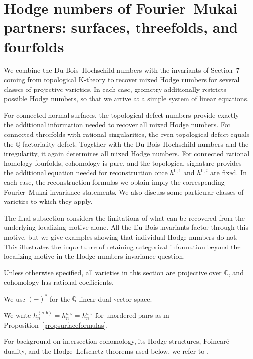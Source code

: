 \documentclass{amsart}
\theoremstyle{plain}
\theoremstyle{definition}
\newcommand{\bbC}{\mathbb{C}}
\newcommand{\bbQ}{\mathbb{Q}}
\begin{document}
\medskip

\section{Hodge numbers of Fourier--Mukai partners: surfaces, threefolds, and fourfolds}
\label{sechodgereconstruction}

We combine the Du Bois--Hochschild numbers with the invariants of Section~7 coming from topological K-theory to recover mixed Hodge numbers for several classes of projective varieties. In each case, geometry additionally restricts possible Hodge numbers, so that we arrive at a simple system of linear equations.

For connected normal surfaces, the topological defect numbers provide exactly the additional information needed to recover all mixed Hodge numbers. For connected threefolds with rational singularities, the even topological defect equals the
$\bbQ$-factoriality defect. Together with the Du Bois--Hochschild numbers and the irregularity, it again determines all mixed Hodge numbers.
For connected rational homology fourfolds, cohomology is pure, and the topological signature provides the additional equation needed for reconstruction once $h^{0,1}$ and $h^{0,2}$ are fixed. In each case, the reconstruction formulas we obtain imply the corresponding Fourier--Mukai invariance statements. We also discuss some particular classes of varieties to which they apply.

The final subsection considers the limitations of what can be recovered from the underlying localizing motive alone. All the Du Bois invariants factor through this motive, but we give examples showing that individual Hodge numbers do not. This illustrates the importance of retaining categorical information beyond the localizing motive in the Hodge numbers invariance question.

\medskip

Unless otherwise specified, all varieties in this section are projective over $\bbC$, and cohomology has rational coefficients.

We use $(-)^*$ for the $\bbQ$-linear dual vector space.

We write $h_n^{(a,b)}=h_n^{a,b}=h_n^{b,a}$ for unordered pairs as in Proposition~\ref{propsurfaceformulas}.


For background on intersection cohomology, its Hodge structures, Poincar\'e duality, and the Hodge--Lefschetz theorems used below, we refer to \cite[Sections~1.9 and~2.1]{dCM09}.
\end{document}
